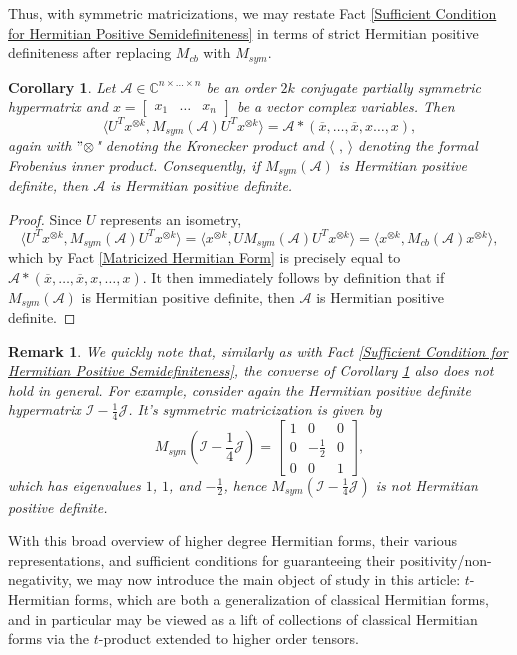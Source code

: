 \documentclass[11pt]{article}
\newtheorem{corollary}[theorem]{Corollary}
\newtheorem{remark}[theorem]{Remark}
\begin{document}
Thus, with symmetric matricizations, we may restate Fact \ref{Sufficient Condition for Hermitian Positive Semidefiniteness} in terms of strict Hermitian positive definiteness after replacing $M_{cb}$ with $M_{sym}$. 
\begin{corollary}\label{Sufficient Condition for Hermitian Positive Definiteness}
    Let $\mathcal{A}\in \mathbb{C}^{n\times\dots\times n}$ be an order $2k$ conjugate partially symmetric hypermatrix and $x = \left[\begin{array}{ccc}
        x_1 & \dots & x_n
    \end{array}\right]$ be a vector complex variables. Then 
    \[\langle U^Tx^{\otimes k}, M_{sym}(\mathcal{A})U^Tx^{\otimes k} \rangle = \mathcal{A}*(\overline{x},\dots,\overline{x},x\dots,x),\]
    again with $"\otimes$" denoting the Kronecker product and $\langle\text{ , }\rangle$ denoting the formal Frobenius inner product. Consequently, if $M_{sym}(\mathcal{A})$ is Hermitian positive definite, then $\mathcal{A}$ is Hermitian positive definite. 
\end{corollary}
\begin{proof}
    Since $U$ represents an isometry,
    \[\langle U^Tx^{\otimes k}, M_{sym}(\mathcal{A})U^Tx^{\otimes k} \rangle = \langle x^{\otimes k},UM_{sym}(\mathcal{A})U^Tx^{\otimes k}\rangle = \langle x^{\otimes k},M_{cb}(\mathcal{A})x^{\otimes k}\rangle,\]
    which by Fact \ref{Matricized Hermitian Form} is precisely equal to $\mathcal{A}*(\overline{x},\dots,\overline{x},x,\dots,x)$. It then immediately follows by definition that if $M_{sym}(\mathcal{A})$ is Hermitian positive definite, then $\mathcal{A}$ is Hermitian positive definite. 
\end{proof}
\begin{remark}
    We quickly note that, similarly as with Fact \ref{Sufficient Condition for Hermitian Positive Semidefiniteness}, the converse of Corollary \ref{Sufficient Condition for Hermitian Positive Definiteness} also does not hold in general. For example, consider again the Hermitian positive definite hypermatrix $\mathcal{I}-\frac{1}{4}\mathcal{J}$. It's symmetric matricization is given by 
    \[M_{sym}\left(\mathcal{I}-\frac{1}{4}\mathcal{J}\right) = \left[\begin{array}{ccc}
        1 & 0 & 0 \\
        0 & -\frac{1}{2} & 0 \\
        0 & 0 & 1
    \end{array}\right],\]
    which has eigenvalues $1$, $1$, and $-\frac{1}{2}$, hence $M_{sym}\left(\mathcal{I}-\frac{1}{4}\mathcal{J}\right)$ is not Hermitian positive definite. 
\end{remark}
With this broad overview of higher degree Hermitian forms, their various representations, and sufficient conditions for guaranteeing their positivity/non-negativity, we may now introduce the main object of study in this article: $t$-Hermitian forms, which are both a generalization of classical Hermitian forms, and in particular may be viewed as a lift of collections of classical Hermitian forms via the $t$-product extended to higher order tensors. 
\end{document}
